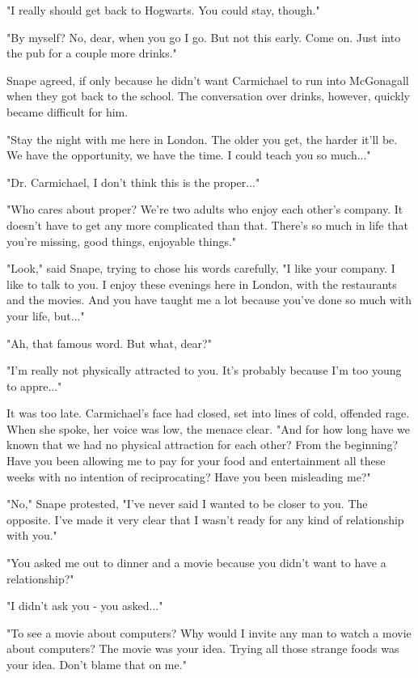 \documentclass[a4paper,11pt]{article}
\begin{document}
"I really should get back to Hogwarts. You could stay, though."

"By myself? No, dear, when you go I go. But not this early. Come on. Just into the pub for a couple more drinks."

Snape agreed, if only because he didn't want Carmichael to run into McGonagall when they got back to the school. The conversation over drinks, however, quickly became difficult for him.

"Stay the night with me here in London. The older you get, the harder it'll be. We have the opportunity, we have the time. I could teach you so much..."

"Dr. Carmichael, I don't think this is the proper..."

"Who cares about proper? We're two adults who enjoy each other's company. It doesn't have to get any more complicated than that. There's so much in life that you're missing, good things, enjoyable things."

"Look," said Snape, trying to chose his words carefully, "I like your company. I like to talk to you. I enjoy these evenings here in London, with the restaurants and the movies. And you have taught me a lot because you've done so much with your life, but..."

"Ah, that famous word. But what, dear?"

"I'm really not physically attracted to you. It's probably because I'm too young to appre..."

It was too late. Carmichael's face had closed, set into lines of cold, offended rage. When she spoke, her voice was low, the menace clear. "And for how long have we known that we had no physical attraction for each other? From the beginning? Have you been allowing me to pay for your food and entertainment all these weeks with no intention of reciprocating? Have you been misleading me?"

"No," Snape protested, "I've never said I wanted to be closer to you. The opposite. I've made it very clear that I wasn't ready for any kind of relationship with you."

"You asked me out to dinner and a movie because you didn't want to have a relationship?"

"I didn't ask you - you asked..."

"To see a movie about computers? Why would I invite any man to watch a movie about computers? The movie was your idea. Trying all those strange foods was your idea. Don't blame that on me."
\end{document}
